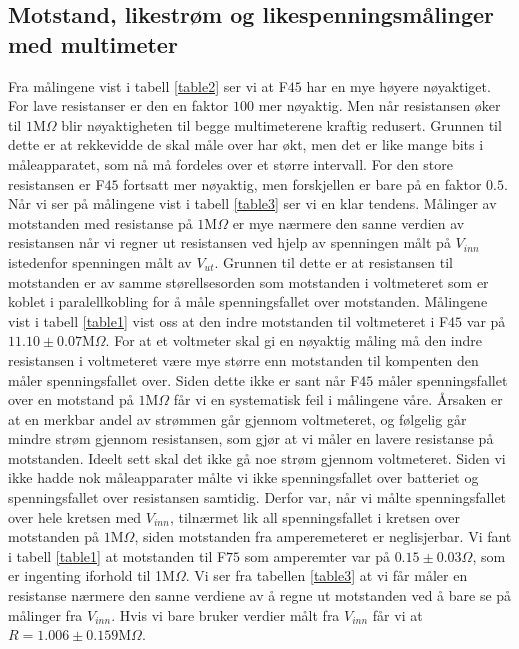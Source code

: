\documentclass[%
 reprint,
nofootinbib,
aps,
]{revtex4-1}
\begin{document}
\subsection{Motstand, likestrøm og likespenningsmålinger med multimeter}
Fra målingene vist i tabell \ref{table2} ser vi at F$45$ har en mye høyere nøyaktiget. For lave resistanser er den en faktor $100$ mer nøyaktig. Men når resistansen øker til $1$M$\Omega$ blir nøyaktigheten til begge multimeterene kraftig redusert. Grunnen til dette er at rekkevidde de skal måle over har økt, men det er like mange bits i måleapparatet, som nå må fordeles over et større intervall. For den store resistansen er F$45$ fortsatt mer nøyaktig, men forskjellen er bare på en faktor $0.5$.
\\
Når vi ser på målingene vist i tabell \ref{table3} ser vi en klar tendens. Målinger av motstanden med resistanse på $1$M$\Omega$ er mye nærmere den sanne verdien av resistansen når vi regner ut resistansen ved hjelp av spenningen målt på $V_{inn}$ istedenfor spenningen målt av  $V_{ut}$.
Grunnen til dette er at resistansen til motstanden er av samme størellsesorden som motstanden i voltmeteret som er koblet i paralellkobling for å måle spenningsfallet over motstanden. Målingene vist i tabell \ref{table1} vist oss at den indre motstanden til voltmeteret i F$45$ var på $11.10\pm0.07$M$\Omega$. For at et voltmeter skal gi en nøyaktig måling må den indre resistansen i voltmeteret være mye større enn motstanden til kompenten den måler spenningsfallet over. Siden dette ikke er sant når F$45$ måler spenningsfallet over en motstand på $1$M$\Omega$ får vi en systematisk feil i målingene våre. Årsaken er at en merkbar andel av strømmen går gjennom voltmeteret, og følgelig går mindre strøm gjennom resistansen, som gjør at vi måler en lavere resistanse på motstanden. Ideelt sett skal det ikke gå noe strøm gjennom voltmeteret.
Siden vi ikke hadde nok måleapparater målte vi ikke spenningsfallet over batteriet og spenningsfallet over resistansen samtidig. Derfor var, når vi målte spenningsfallet over hele kretsen med $V_{inn}$, tilnærmet lik all spenningsfallet i kretsen over motstanden på $1$M$\Omega$, siden motstanden fra amperemeteret er neglisjerbar. Vi fant i tabell \ref{table1} at motstanden til F$75$ som amperemter var på $0.15 \pm 0.03\Omega$, som er ingenting iforhold til 1M$\Omega$.
Vi ser fra tabellen \ref{table3} at vi får måler en resistanse nærmere den sanne verdiene av å regne ut motstanden ved å bare se på målinger fra $V_{inn}$. Hvis vi bare bruker verdier målt fra $V_{inn}$ får vi at $R = 1.006 \pm 0.159$M$\Omega$.
\end{document}
